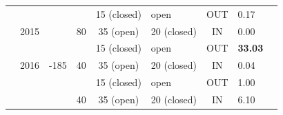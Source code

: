 \documentclass[encoding=utf8,british]{tumphthesis}
\begin{document}
\begin{table}[H]
\begin{tabular}{|c|c|c|l|c|l|c|l|r|}
\rowcolor[HTML]{EFEFEF} 
\cellcolor[HTML]{EFEFEF}                       & \cellcolor[HTML]{EFEFEF}                       & \cellcolor[HTML]{EFEFEF}                                           & \cellcolor[HTML]{EFEFEF}                                         & 15 (closed)                       & open                                & OUT                        & 0.17                          \\
\rowcolor[HTML]{EFEFEF} 
\cellcolor[HTML]{EFEFEF}                       & \multirow{-2}{*}{\cellcolor[HTML]{EFEFEF}2015} & \multirow{-2}{*}{\cellcolor[HTML]{EFEFEF}}                         & \multirow{-2}{*}{\cellcolor[HTML]{EFEFEF}80}                     & \cellcolor[HTML]{9FC5E8}35 (open) & \cellcolor[HTML]{9FC5E8}20 (closed) & \cellcolor[HTML]{9FC5E8}IN & \cellcolor[HTML]{9FC5E8}0.00  \\
\rowcolor[HTML]{EFEFEF} 
\cellcolor[HTML]{EFEFEF}                       & \cellcolor[HTML]{9FC5E8}                       & \multicolumn{1}{c}{\cellcolor[HTML]{9FC5E8}}                       & \multicolumn{1}{|c|}{\cellcolor[HTML]{9FC5E8}}                     & 15 (closed)                       & open                                & OUT                        & \textbf{33.03}                \\
\rowcolor[HTML]{9FC5E8} 
\cellcolor[HTML]{EFEFEF}                       & \multirow{-2}{*}{\cellcolor[HTML]{9FC5E8}2016} & \multicolumn{1}{|c|}{\multirow{-2}{*}{\cellcolor[HTML]{9FC5E8}-185}} & \multicolumn{1}{|c|}{\multirow{-2}{*}{\cellcolor[HTML]{9FC5E8}40}} & 35 (open)                         & 20 (closed)                         & IN                         & 0.04                          \\
\rowcolor[HTML]{EFEFEF} 
\cellcolor[HTML]{EFEFEF}                       & \cellcolor[HTML]{EFEFEF}                       & \cellcolor[HTML]{EFEFEF}                                           & \cellcolor[HTML]{EFEFEF}                                         & 15 (closed)                       & open                                & OUT                        & 1.00                          \\
\rowcolor[HTML]{EFEFEF} 
\cellcolor[HTML]{EFEFEF}                       & \cellcolor[HTML]{EFEFEF}                       & \cellcolor[HTML]{EFEFEF}                                           & \multirow{-2}{*}{\cellcolor[HTML]{EFEFEF}40}                     & \cellcolor[HTML]{9FC5E8}35 (open) & \cellcolor[HTML]{9FC5E8}20 (closed) & \cellcolor[HTML]{9FC5E8}IN & \cellcolor[HTML]{9FC5E8}6.10  \\

\end{tabular}
\end{table}
\end{document}
